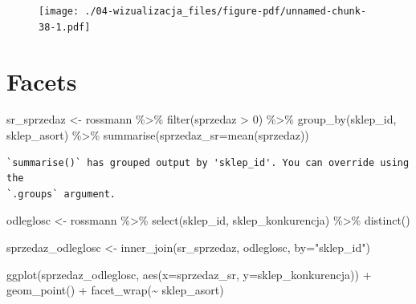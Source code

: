 \documentclass[
  letterpaper,
  DIV=11,
  numbers=noendperiod]{scrreprt}
\newenvironment{Shaded}{\begin{snugshade}}{\end{snugshade}}
\newcommand{\AttributeTok}[1]{\textcolor[rgb]{0.40,0.45,0.13}{#1}}
\newcommand{\DecValTok}[1]{\textcolor[rgb]{0.68,0.00,0.00}{#1}}
\newcommand{\FunctionTok}[1]{\textcolor[rgb]{0.28,0.35,0.67}{#1}}
\newcommand{\NormalTok}[1]{\textcolor[rgb]{0.00,0.23,0.31}{#1}}
\newcommand{\OtherTok}[1]{\textcolor[rgb]{0.00,0.23,0.31}{#1}}
\newcommand{\SpecialCharTok}[1]{\textcolor[rgb]{0.37,0.37,0.37}{#1}}
\newcommand{\StringTok}[1]{\textcolor[rgb]{0.13,0.47,0.30}{#1}}
\begin{document}
\begin{figure}[H]

{\centering \texttt{[image: ./04-wizualizacja\_files/figure-pdf/unnamed-chunk-38-1.pdf]}

}

\end{figure}

\hypertarget{facets}{%
\section{Facets}\label{facets}}

\begin{Shaded}
\begin{Highlighting}[]
\NormalTok{sr\_sprzedaz }\OtherTok{\textless{}{-}}\NormalTok{ rossmann }\SpecialCharTok{\%\textgreater{}\%}
  \FunctionTok{filter}\NormalTok{(sprzedaz }\SpecialCharTok{\textgreater{}} \DecValTok{0}\NormalTok{) }\SpecialCharTok{\%\textgreater{}\%}
  \FunctionTok{group\_by}\NormalTok{(sklep\_id, sklep\_asort) }\SpecialCharTok{\%\textgreater{}\%}
  \FunctionTok{summarise}\NormalTok{(}\AttributeTok{sprzedaz\_sr=}\FunctionTok{mean}\NormalTok{(sprzedaz))}
\end{Highlighting}
\end{Shaded}

\begin{verbatim}
`summarise()` has grouped output by 'sklep_id'. You can override using the
`.groups` argument.
\end{verbatim}

\begin{Shaded}
\begin{Highlighting}[]
\NormalTok{odleglosc }\OtherTok{\textless{}{-}}\NormalTok{ rossmann }\SpecialCharTok{\%\textgreater{}\%}
  \FunctionTok{select}\NormalTok{(sklep\_id, sklep\_konkurencja) }\SpecialCharTok{\%\textgreater{}\%}
  \FunctionTok{distinct}\NormalTok{()}

\NormalTok{sprzedaz\_odleglosc }\OtherTok{\textless{}{-}} \FunctionTok{inner\_join}\NormalTok{(sr\_sprzedaz, odleglosc, }\AttributeTok{by=}\StringTok{"sklep\_id"}\NormalTok{)}

\FunctionTok{ggplot}\NormalTok{(sprzedaz\_odleglosc, }\FunctionTok{aes}\NormalTok{(}\AttributeTok{x=}\NormalTok{sprzedaz\_sr, }\AttributeTok{y=}\NormalTok{sklep\_konkurencja)) }\SpecialCharTok{+} 
  \FunctionTok{geom\_point}\NormalTok{() }\SpecialCharTok{+}
  \FunctionTok{facet\_wrap}\NormalTok{(}\SpecialCharTok{\textasciitilde{}}\NormalTok{ sklep\_asort)}
\end{Highlighting}
\end{Shaded}
\end{document}

